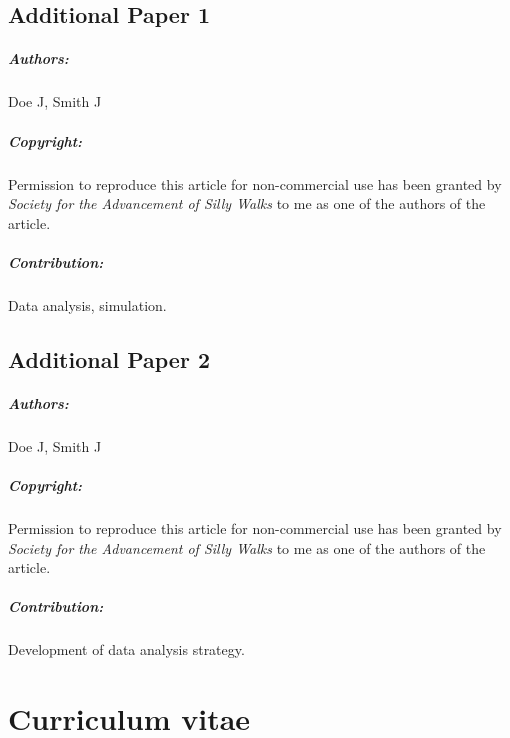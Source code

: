 \documentclass[pdftex, a4paper, oneside, 12pt, bibtotoc, idxtotoc ]{scrreprt}
\newcommand*\cleartorightpage{%
  \clearpage
  \ifodd\value{page}
  \else
    \newpage\thispagestyle{empty} \mbox{}
  \fi
}
\begin{document}
\section{Additional Paper 1}
\label{sec:paper1}
\paragraph{Authors:}  Doe J, Smith J 
\paragraph{Copyright:} Permission to reproduce this article for non-commercial
use has been granted by \textit{Society for the Advancement of Silly Walks}
to me as one of the authors of the article.
\paragraph{Contribution:} Data analysis, simulation. 
% 

\section{Additional Paper 2}
\label{sec:collins_1433}
\paragraph{Authors:}  Doe J, Smith J 
\paragraph{Copyright:} Permission to reproduce this article for non-commercial
use has been granted by \textit{Society for the Advancement of Silly Walks}
to me as one of the authors of the article.
\paragraph{Contribution:} Development of data analysis strategy.
% 

\clearpage
{}
\listoffigures
\clearpage
{}
\listoftables

\cleartorightpage
\chapter{Curriculum vitae}
\label{sec:cv}
% 
\end{document}
